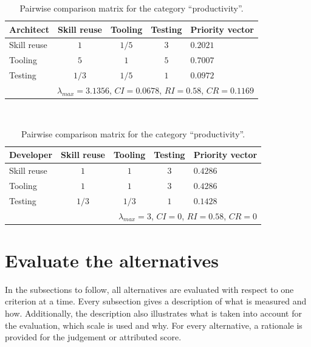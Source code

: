\begin{table}[h!]
    \centering
    \begin{tabular}{lcccl}
        \hline
        \textbf{Architect} & Skill reuse & Tooling & Testing & Priority vector \\
        \hline
        Skill reuse        & $1$         & $1/5$   & $3$     & $0.2021$        \\
        Tooling            & $5$         & $1$     & $5$     & $0.7007$        \\
        Testing            & $1/3$       & $1/5$   & $1$     & $0.0972$        \\
        \hline
        \multicolumn{5}{r}{$\lambda_{max} = 3.1356$, $CI = 0.0678$, $RI = 0.58$, $CR = 0.1169$}\\
        \hline
    \end{tabular}
    \\\vspace{1em}
    \begin{tabular}{lcccl}
        \hline
        \textbf{Developer} & Skill reuse & Tooling & Testing & Priority vector  \\
        \hline
        Skill reuse        & $1$         & $1$     & $3$     & $0.4286$         \\
        Tooling            & $1$         & $1$     & $3$     & $0.4286$         \\
        Testing            & $1/3$       & $1/3$   & $1$     & $0.1428$         \\
        \hline
        \multicolumn{5}{r}{$\lambda_{max} = 3$, $CI = 0$, $RI = 0.58$, $CR = 0$}\\
        \hline
    \end{tabular}
    \caption{Pairwise comparison matrix for the category ``productivity''.}
    \label{tab:productivity}
\end{table}

\section{Evaluate the alternatives}
\label{sec:ev:alt}

In the subsections to follow, all alternatives are evaluated with respect to one criterion at a time. Every subsection gives a description of what is measured and how. Additionally, the description also illustrates what is taken into account for the evaluation, which scale is used and why. For every alternative, a rationale is provided for the judgement or attributed score.

